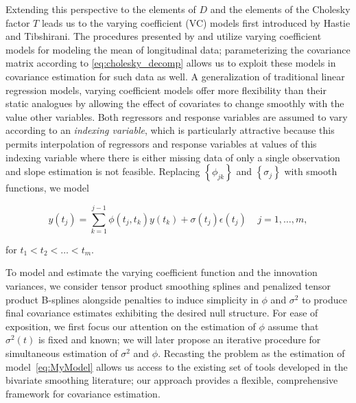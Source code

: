 \documentclass[12pt]{article}
\theoremstyle{definition}
\begin{document}
Extending this perspective to the elements of $D$ and the elements of the Cholesky factor $T$ leads us to  %
the varying coefficient (VC) models first introduced by Hastie and Tibshirani. 
The procedures presented by \citet{fan2000two} and \citet{huang2002varying} utilize varying coefficient models for modeling the mean of longitudinal data; parameterizing the covariance matrix according to \ref{eq:cholesky_decomp} allows us to exploit these models in covariance estimation for such data as well.  A generalization of traditional linear regression models, varying coefficient models offer more flexibility than their static analogues by allowing the effect of covariates to change smoothly with the value other variables. Both regressors and response variables are assumed to vary according to an \emph{indexing variable}, which is particularly attractive because this permits interpolation of regressors and response variables at values of this indexing variable where there is either missing data of only a single observation and slope estimation is not feasible.  Replacing  $\left \{ \phi_{jk} \right\}$ and $\left\{ \sigma_j \right\}$ with smooth functions, we model 

\begin{equation}   
y\left(t_j \right)  = \sum_{k=1}^{j-1} \phi\left(t_j ,t_k\right) y\left(t_k\right) + \sigma\left(t_j\right)\epsilon\left({t_j}\right) \;\;\;\; j=1,\dots, m, 
\label{eq:MyModel} 
\end{equation}

\noindent for $t_1 < t_2 < \dots < t_m$. 

To model and estimate the varying coefficient function and the innovation variances, we consider tensor product smoothing splines and penalized tensor product B-splines alongside penalties to induce simplicity in $\phi$ and $\sigma^2$  to produce final covariance estimates exhibiting the desired null structure.  For ease of exposition, we first focus our attention on the estimation of $\phi$ assume that $\sigma^2\left(t\right)$ is fixed and known; we will later propose an iterative procedure for simultaneous estimation of $\sigma^2$ and $\phi$.    %
Recasting the problem as the estimation of model~\ref{eq:MyModel} allows us access to the existing set of tools developed in the bivariate smoothing literature; our approach provides a flexible, comprehensive framework for covariance estimation.
\end{document}
